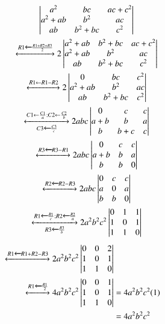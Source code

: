 
\begin{multline}
    \begin{vmatrix}a^2 & bc & ac+c^2 \\ a^2+ab & b^2 & ac \\ ab & b^2+bc & c^2\end{vmatrix} \\ 
    \xleftrightarrow[]{R1 \xleftarrow{} \frac{R1+R2+R3}{2}} 2\begin{vmatrix}a^2+ab & b^2+bc & ac+c^2 \\ a^2+ab & b^2 & ac \\ ab & b^2+bc & c^2\end{vmatrix} \\ 
    \xleftrightarrow[]{R1 \leftarrow R1-R2} 2\begin{vmatrix}0 & bc & c^2 \\ a^2+ab & b^2 & ac \\ ab & b^2+bc & c^2\end{vmatrix} \\
    \xleftrightarrow[C3 \xleftarrow{} \frac{C3}{c}]{C1 \leftarrow \frac{C1}{a}; C2 \leftarrow \frac{C2}{b}} 2abc\begin{vmatrix}0 & c & c \\ a+b & b & a \\ b & b+c & c\end{vmatrix} \\ 
    \xleftrightarrow[]{R3 \xleftarrow{} R3-R1} 2abc\begin{vmatrix}0 & c & c \\ a+b & b & a \\ b & b & 0\end{vmatrix} \\
    \xleftrightarrow[]{R2 \xleftarrow{} R2-R3} 2abc\begin{vmatrix}0 & c & c \\ a & 0 & a \\ b & b & 0\end{vmatrix} \\
    \xleftrightarrow[R3 \xleftarrow{} \frac{R3}{b}]{R1 \xleftarrow{} \frac{R1}{c} ; R2 \xleftarrow{} \frac{R2}{a}} 2a^2b^2c^2\begin{vmatrix}0 & 1 & 1 \\ 1 & 0 & 1 \\ 1 & 1 & 0\end{vmatrix}
\end{multline}
\begin{align}
    \xleftrightarrow[]{R1 \xleftarrow{} R1+R2-R3} 2a^2b^2c^2\begin{vmatrix}0 & 0 & 2 \\ 1 & 0 & 1 \\ 1 & 1 & 0\end{vmatrix} \\
    \xleftrightarrow[]{R1 \xleftarrow{} \frac{R1}{2}} 4a^2b^2c^2\begin{vmatrix}0 & 0 & 1 \\ 1 & 0 & 1 \\ 1 & 1 & 0\end{vmatrix} &= 4a^2b^2c^2(1) \\
    &= 4a^2b^2c^2
\end{align}
